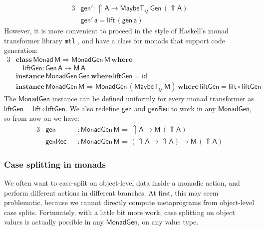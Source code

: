 \documentclass[acmsmall,screen,review,anonymous]{acmart}
\newcommand{\mit}[1]{{\mathsf{#1}}}
\newcommand{\msf}[1]{{\mathsf{#1}}}
\newcommand{\mbf}[1]{{\mathbf{#1}}}
\newcommand{\ind}{\hspace{1em}}
\newcommand{\where}{\mbf{where}}
\newcommand{\M}{\msf{M}}
\newcommand{\vA}{\mathsf{A}}
\newcommand{\vM}{\mathsf{M}}
\newcommand{\va}{\mathsf{a}}
\newcommand{\Monad}{\msf{Monad}}
\newcommand{\Up}{{\Uparrow}}
\newcommand{\MaybeT}{\msf{MaybeT}}
\theoremstyle{remark}
\newcommand{\id}{\mit{id}}
\newcommand{\tyclass}{\mbf{class}}
\newcommand{\instance}{\mbf{instance}\,}
\newcommand{\Gen}{\msf{Gen}}
\newcommand{\gen}{\mit{gen}}
\newcommand{\genRec}{\mit{genRec}}
\newcommand{\lift}{\mit{lift}}
\newcommand{\liftGen}{\mit{liftGen}}
\newcommand{\MonadGen}{\msf{MonadGen}}
\newcommand{\RA}{\Rightarrow}
\begin{document}
\begin{alignat*}{3}
  &\gen' : \Up \vA \to \MaybeT_\M\,\Gen\,(\Up \vA) \\
  &\gen'\,\va = \lift\,(\gen\,\va)
\end{alignat*}
However, it is more convenient to proceed in the style of Haskell's monad
transformer library \texttt{mtl} \cite{mtl}, and have a class for monads that
support code generation:
\begin{alignat*}{3}
&\tyclass\,\Monad\,\vM \RA \MonadGen\,\vM\,\where\\
&\ind \liftGen : \Gen\,\vA \to \M\,\vA\\
&\instance \MonadGen\,\Gen\,\where\,\liftGen = \id \\
&\instance \MonadGen\,\vM \RA \MonadGen\,(\MaybeT_\M\,\vM)\,\where\,\liftGen = \lift \circ \liftGen
\end{alignat*}
The $\MonadGen$ instance can be defined uniformly for every monad transformer as
$\liftGen = \lift \circ \liftGen$. We also redefine $\gen$ and $\genRec$ to work
in any $\MonadGen$, so from now on we have:
\begin{alignat*}{3}
 &\gen   &&: \MonadGen\,\vM \RA \Up \vA \to \vM\,(\Up \vA)\\
 &\genRec &&: \MonadGen\,\vM \RA (\Up \vA \to \Up \vA) \to \vM\,(\Up \vA)
\end{alignat*}

\subsubsection{Case splitting in monads}
We often want to case-split on object-level data inside a monadic action, and
perform different actions in different branches. At first, this may seem
problematic, because we cannot directly compute metaprograms from object-level
case splits. Fortunately, with a little bit more work, case splitting on object
values is actually possible in any $\MonadGen$, on any value type.
\end{document}
